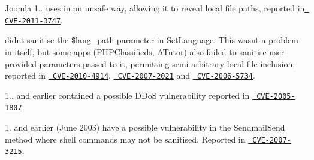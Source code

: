 Joomla 1.. uses  in an unsafe way, allowing it to reveal local file paths, reported in \href{https://web.nvd.nist.gov/view/vuln/detail?vulnId=CVE-2011-3747}{\texttt{ CVE-\/2011-\/3747}}.

 didn\textquotesingle{}t sanitise the {\ttfamily \$lang\+\_\+path} parameter in {\ttfamily Set\+Language}. This wasn\textquotesingle{}t a problem in itself, but some apps (PHPClassifieds, ATutor) also failed to sanitise user-\/provided parameters passed to it, permitting semi-\/arbitrary local file inclusion, reported in \href{https://web.nvd.nist.gov/view/vuln/detail?vulnId=CVE-2010-4914}{\texttt{ CVE-\/2010-\/4914}}, \href{https://web.nvd.nist.gov/view/vuln/detail?vulnId=CVE-2007-2021}{\texttt{ CVE-\/2007-\/2021}} and \href{https://web.nvd.nist.gov/view/vuln/detail?vulnId=CVE-2006-5734}{\texttt{ CVE-\/2006-\/5734}}.

 1.. and earlier contained a possible DDoS vulnerability reported in \href{https://web.nvd.nist.gov/view/vuln/detail?vulnId=CVE-2005-1807}{\texttt{ CVE-\/2005-\/1807}}.

 1. and earlier (June 2003) have a possible vulnerability in the {\ttfamily Sendmail\+Send} method where shell commands may not be sanitised. Reported in \href{https://web.nvd.nist.gov/view/vuln/detail?vulnId=CVE-2007-3215}{\texttt{ CVE-\/2007-\/3215}}. 